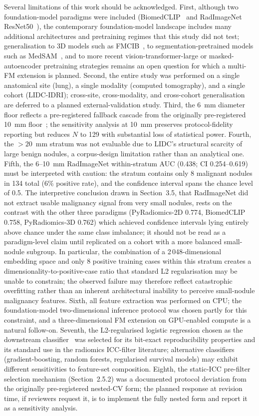 Several limitations of this work should be acknowledged. First, although two foundation-model paradigms were included (BiomedCLIP~\cite{zhang2024biomedclip} and RadImageNet ResNet50~\cite{mei2022radimagenet}), the contemporary foundation-model landscape includes many additional architectures and pretraining regimes that this study did not test; generalisation to 3D models such as FMCIB~\cite{pai2024}, to segmentation-pretrained models such as MedSAM~\cite{ma2024medsam}, and to more recent vision-transformer-large or masked-autoencoder pretraining strategies remains an open question for which a multi-FM extension is planned. Second, the entire study was performed on a single anatomical site (lung), a single modality (computed tomography), and a single cohort (LIDC-IDRI); cross-site, cross-modality, and cross-cohort generalisation are deferred to a planned external-validation study. Third, the 6~mm diameter floor reflects a pre-registered fallback cascade from the originally pre-registered 10~mm floor~\cite{macmahon2017}; the sensitivity analysis at 10~mm preserves protocol-fidelity reporting but reduces $N$ to 129 with substantial loss of statistical power. Fourth, the $>20$~mm stratum was not evaluable due to LIDC's structural scarcity of large benign nodules, a corpus-design limitation rather than an analytical one. Fifth, the 6--10~mm RadImageNet within-stratum AUC (0.438; CI 0.254--0.619) must be interpreted with caution: the stratum contains only 8 malignant nodules in 134 total (6\% positive rate), and the confidence interval spans the chance level of 0.5. The interpretive conclusion drawn in Section~3.5, that RadImageNet did not extract usable malignancy signal from very small nodules, rests on the contrast with the other three paradigms (PyRadiomics-2D 0.774, BiomedCLIP 0.758, PyRadiomics-3D 0.762) which achieved confidence intervals lying entirely above chance under the same class imbalance; it should not be read as a paradigm-level claim until replicated on a cohort with a more balanced small-nodule subgroup. In particular, the combination of a 2\,048-dimensional embedding space and only 8 positive training cases within this stratum creates a dimensionality-to-positive-case ratio that standard L2 regularisation may be unable to constrain; the observed failure may therefore reflect catastrophic overfitting rather than an inherent architectural inability to perceive small-nodule malignancy features. Sixth, all feature extraction was performed on CPU; the foundation-model two-dimensional inference protocol was chosen partly for this constraint, and a three-dimensional FM extension on GPU-enabled compute is a natural follow-on. Seventh, the L2-regularised logistic regression chosen as the downstream classifier~\cite{hosmer2013} was selected for its bit-exact reproducibility properties and its standard use in the radiomics ICC-filter literature; alternative classifiers (gradient-boosting, random forests, regularised survival models) may exhibit different sensitivities to feature-set composition. Eighth, the static-ICC pre-filter selection mechanism (Section~2.5.2) was a documented protocol deviation from the originally pre-registered nested-CV form; the planned response at revision time, if reviewers request it, is to implement the fully nested form and report it as a sensitivity analysis.

